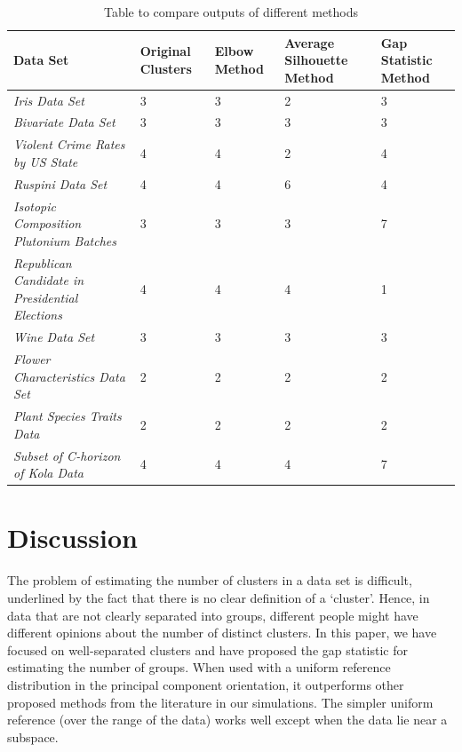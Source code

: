 \begin{table}[h]
 \caption{Table to compare outputs of different methods}
 \begin{tabular}{|C{8.1cm}|C{1.5cm}|C{1.3cm}|C{1.8cm}|C{1.4cm}|}
 \hline
  Data Set & Original Clusters & Elbow Method & Average Silhouette Method & Gap Statistic Method \\ [0.5ex]
 \hline
 \textit{Iris Data Set} & 3 & 3 & 2 & 3 \\
 \hline
 \textit{Bivariate Data Set} & 3 & 3 & 3 & 3 \\
 \hline
 \textit{Violent Crime Rates by US State} & 4 & 4 & 2 & 4 \\
 \hline
 \textit{Ruspini Data Set} & 4 & 4 & 6 & 4 \\
 \hline
 \textit{Isotopic Composition Plutonium Batches} & 3 & 3 & 3 & 7 \\
 \hline
 \textit{Republican Candidate in Presidential Elections} & 4 & 4 & 4 & 1 \\
 \hline
 \textit{Wine Data Set} & 3 & 3 & 3 & 3 \\
 \hline
 \textit{Flower Characteristics Data Set} & 2 & 2 & 2 & 2 \\
 \hline
 \textit{Plant Species Traits Data} & 2 & 2 & 2 & 2 \\
 \hline
 \textit{Subset of C-horizon of Kola Data} & 4 & 4 & 4 & 7 \\
 \hline
\end{tabular}
\label{table:1}
\end{table}

\section{Discussion}
The problem of estimating the number of clusters in a data set is difficult, underlined by the fact that there is no clear definition of a `cluster'. Hence, in data that are not clearly separated into groups, different people might have different opinions about the number of distinct clusters. In this paper, we have focused on well-separated clusters and have proposed the gap statistic for estimating the number of groups. When used with a uniform reference distribution in the principal component orientation, it outperforms other proposed methods
from the literature in our simulations. The simpler uniform reference (over the range of the data) works well except when the data lie near a subspace.


